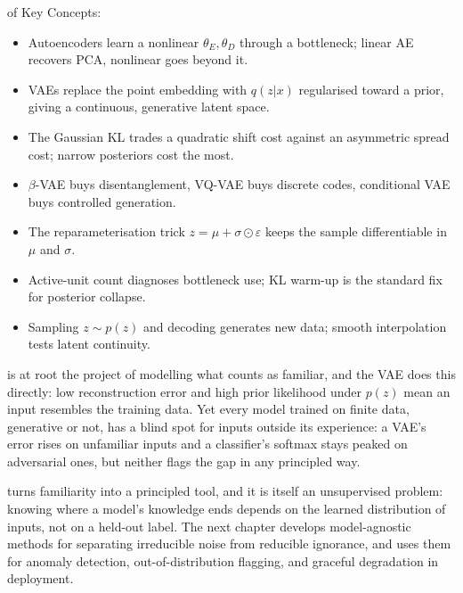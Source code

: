  of Key Concepts:
\begin{itemize}
    \item Autoencoders learn a nonlinear $\theta_E, \theta_D$ through a bottleneck; linear AE recovers PCA, nonlinear goes beyond it.
    \item VAEs replace the point embedding with $q(z|x)$ regularised toward a prior, giving a continuous, generative latent space.
    \item The Gaussian KL trades a quadratic shift cost against an asymmetric spread cost; narrow posteriors cost the most.
    \item $\beta$-VAE buys disentanglement, VQ-VAE buys discrete codes, conditional VAE buys controlled generation.
    \item The reparameterisation trick $z = \mu + \sigma \odot \varepsilon$ keeps the sample differentiable in $\mu$ and $\sigma$.
    \item Active-unit count diagnoses bottleneck use; KL warm-up is the standard fix for posterior collapse.
    \item Sampling $z \sim p(z)$ and decoding generates new data; smooth interpolation tests latent continuity.
\end{itemize}


 is at root the project of modelling what counts as familiar, and the VAE does this directly: low reconstruction error and high prior likelihood under $p(z)$ mean an input resembles the training data.
Yet every model trained on finite data, generative or not, has a blind spot for inputs outside its experience: a VAE's error rises on unfamiliar inputs and a classifier's softmax stays peaked on adversarial ones, but neither flags the gap in any principled way.

 turns familiarity into a principled tool, and it is itself an unsupervised problem: knowing where a model's knowledge ends depends on the learned distribution of inputs, not on a held-out label.
The next chapter develops model-agnostic methods for separating irreducible noise from reducible ignorance, and uses them for anomaly detection, out-of-distribution flagging, and graceful degradation in deployment.


\clearpage
